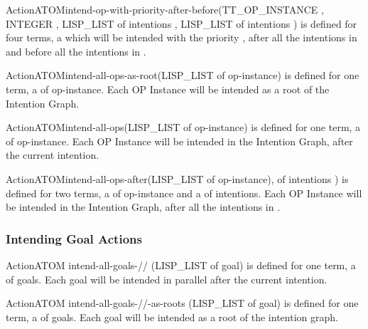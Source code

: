 \begin{typeefa}{Action}{ATOM}{intend-op-with-priority-after-before}{(TT\_OP\_INSTANCE , INTEGER , LISP\_LIST of intentions , LISP\_LIST of intentions )}
is defined for four terms, a   which will be
intended with the priority , after all the intentions in
 and before all the intentions in .
\end{typeefa}

\begin{typeefa}{Action}{ATOM}{intend-all-ops-as-root}{(LISP\_LIST of op-instance)}
is defined for one term, a  of op-instance. Each OP
Instance will be intended as a root of the Intention Graph.
\end{typeefa}

\begin{typeefa}{Action}{ATOM}{intend-all-ops}{(LISP\_LIST of op-instance)}
is defined for one term, a  of op-instance. Each OP Instance will be
intended in the Intention Graph, after the current intention.
\end{typeefa}

\begin{typeefa}{Action}{ATOM}{intend-all-ops-after}{(LISP\_LIST of op-instance),
 of intentions )} is defined for two terms, a  of
op-instance and  a  of intentions. Each OP Instance will be
intended in the Intention Graph, after all the intentions in .
\end{typeefa}

\subsubsection{Intending Goal Actions}

\begin{typeefa}{Action}{ATOM} {intend-all-goals-//} {(LISP\_LIST of goal)}
is defined for one term, a  of goals. Each goal will be intended
in parallel after the current intention.
\end{typeefa}

\begin{typeefa}{Action}{ATOM} {intend-all-goals-//-as-roots} {(LISP\_LIST of
goal)}
is defined for one term, a  of goals.
Each goal will be intended as a root of the intention graph.
\end{typeefa}


